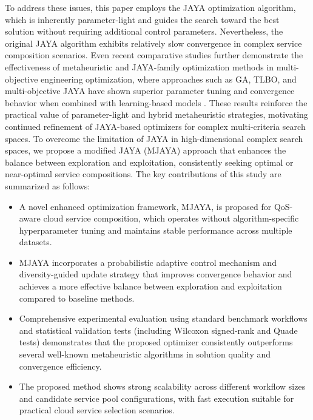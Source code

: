 \documentclass[3p,twocolumn]{elsarticle}
\theoremstyle{thmstyleone}%
\theoremstyle{thmstyletwo}%
\theoremstyle{thmstylethree}%
\begin{document}
To address these issues, this paper employs the JAYA optimization algorithm, which is inherently parameter-light and guides the search toward the best solution without requiring additional control parameters. Nevertheless, the original JAYA algorithm exhibits relatively slow convergence in complex service composition scenarios. Even recent comparative studies further demonstrate the effectiveness of metaheuristic and JAYA-family optimization methods in multi-objective engineering optimization, where approaches such as GA, TLBO, and multi-objective JAYA have shown superior parameter tuning and convergence behavior when combined with learning-based models \cite{siyoum2025comparative, chanie2025optimization}. These results reinforce the practical value of parameter-light and hybrid metaheuristic strategies, motivating continued refinement of JAYA-based optimizers for complex multi-criteria search spaces. To overcome the limitation of JAYA in high-dimensional complex search spaces, we propose a modified JAYA (MJAYA) approach that enhances the balance between exploration and exploitation, consistently seeking optimal or near-optimal service compositions. The key contributions of this study are summarized as follows:



\begin{itemize}
	\item A novel enhanced optimization framework, MJAYA, is proposed for QoS-aware cloud service composition, which operates without algorithm-specific hyperparameter tuning and maintains stable performance across multiple datasets.
	
	\item MJAYA incorporates a probabilistic adaptive control mechanism and diversity-guided update strategy that improves convergence behavior and achieves a more effective balance between exploration and exploitation compared to baseline methods.
	
	\item Comprehensive experimental evaluation using standard benchmark workflows and statistical validation tests (including Wilcoxon signed-rank and Quade tests) demonstrates that the proposed optimizer consistently outperforms several well-known metaheuristic algorithms in solution quality and convergence efficiency.
	
	\item The proposed method shows strong scalability across different workflow sizes and candidate service pool configurations, with fast execution suitable for practical cloud service selection scenarios.
\end{itemize}
\end{document}
